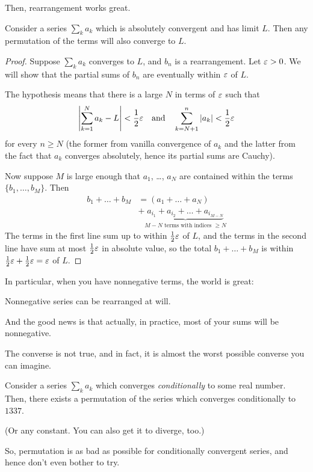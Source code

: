 Then, rearrangement works great.
\begin{theorem}
	Consider a series $\sum_k a_k$ which is absolutely convergent
	and has limit $L$.
	Then any permutation of the terms will also converge to $L$.
\end{theorem}
\begin{proof}
	Suppose $\sum_k a_k$ converges to $L$,
	and $b_n$ is a rearrangement.
	Let $\varepsilon > 0$.
	We will show that the partial sums of $b_n$
	are eventually within $\varepsilon$ of $L$.

	The hypothesis means that there is a large $N$ in terms of $\varepsilon$
	such that
	\[ \left\lvert \sum_{k=1}^N a_k - L \right\rvert < \frac{1}{2}\varepsilon
		\quad\text{and}\quad
		\sum_{k = N+1}^{n} \left\lvert a_k \right\rvert < \frac{1}{2}\varepsilon
	\]
	for every $n \ge N$ (the former from vanilla convergence of $a_k$
	and the latter from the fact that $a_k$ converges absolutely,
	hence its partial sums are Cauchy).

	Now suppose $M$ is large enough that $a_1$, \dots, $a_N$
	are contained within the terms $\{b_1, \dots, b_M\}$.
	Then
	\begin{align*}
		b_1 + \dots + b_M
		&= (a_1 + \dots + a_N) \\
		&+ \underbrace{a_{i_1} + a_{i_2} + \dots + a_{i_{M-N}}}%
		_{\text{$M-N$ terms with indices $\ge N$}}
	\end{align*}
	The terms in the first line sum up to within $\frac{1}{2}\varepsilon$ of $L$,
	and the terms in the second line have sum at most $\frac{1}{2}\varepsilon$
	in absolute value, so the total $b_1 + \dots + b_M$
	is within $\frac{1}{2}\varepsilon + \frac{1}{2}\varepsilon = \varepsilon$ of $L$.
\end{proof}
In particular, when you have nonnegative terms, the world is great:
\begin{moral}
	Nonnegative series can be rearranged at will.
\end{moral}
And the good news is that actually,
in practice, most of your sums will be nonnegative.

The converse is not true,
and in fact, it is almost the worst possible converse you can imagine.
\begin{theorem}
	Consider a series $\sum_k a_k$ which converges \emph{conditionally}
	to some real number.
	Then, there exists a permutation of the series
	which converges conditionally to $1337$.

	(Or any constant.  You can also get it to diverge, too.)
\end{theorem}
So, permutation is as bad as possible for conditionally convergent
series, and hence don't even bother to try.

